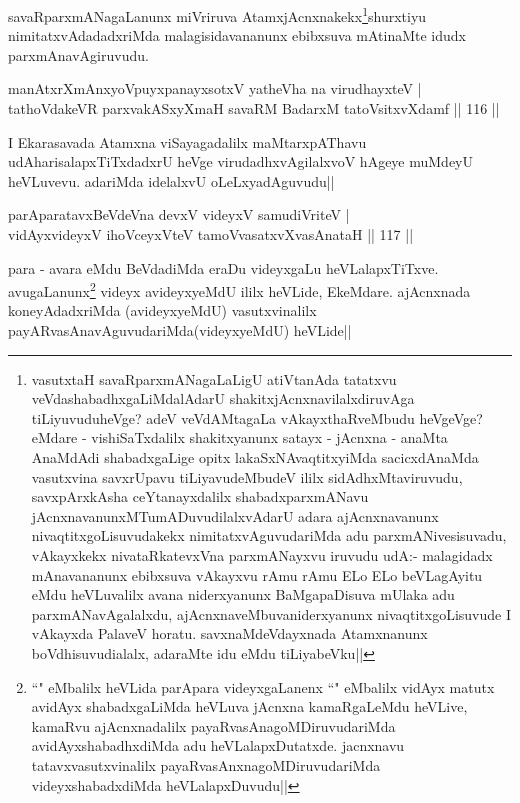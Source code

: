 \begin{artha}
savaRparxmANagaLanunx miVriruva AtamxjAcnxnakekx\footnote{vasutxtaH savaRparxmANagaLaLigU atiVtanAda tatatxvu veVdashabadhxgaLiMdalAdarU shakitxjAcnxnavilalxdiruvAga tiLiyuvuduheVge? adeV veVdAMtagaLa vAkayxthaRveMbudu heVgeVge? eMdare - vishiSaTxdalilx shakitxyanunx satayx - jAcnxna - anaMta AnaMdAdi shabadxgaLige opitx lakaSxNAvaqtitxyiMda sacicxdAnaMda vasutxvina savxrUpavu tiLiyavudeMbudeV ililx sidAdhxMtaviruvudu, savxpArxkAsha ceYtanayxdalilx shabadxparxmANavu jAcnxnavanunxMTumADuvudilalxvAdarU adara ajAcnxnavanunx nivaqtitxgoLisuvudakekx nimitatxvAguvudariMda adu parxmANivesisuvadu, vAkayxkekx nivataRkatevxVna parxmANayxvu iruvudu udA:- malagidadx mAnavananunx ebibxsuva vAkayxvu rAmu rAmu ELo ELo beVLagAyitu eMdu heVLuvalilx avana niderxyanunx BaMgapaDisuva mUlaka adu parxmANavAgalalxdu, ajAcnxnaveMbuvaniderxyanunx nivaqtitxgoLisuvude I vAkayxda PalaveV horatu. savxnaMdeVdayxnada Atamxnanunx boVdhisuvudialalx, adaraMte idu eMdu tiLiyabeVku||}shurxtiyu nimitatxvAdadadxriMda 
malagisidavananunx ebibxsuva mAtinaMte idudx parxmAnavAgiruvudu.
\end{artha}

\begin{shl}
manAtxrXmAnxyoV\s puyxpanayxsotxV yatheVha na virudhayxteV |\\
tathoVdakeVR parxvakASxyXmaH savaRM BadarxM tatoV\s sitxvXdamf \hfill || 116 ||
\end{shl}

\begin{artha}
I Ekarasavada Atamxna viSayagadalilx maMtarxpAThavu udAharisalapxTiTxdadxrU heVge virudadhxvAgilalxvoV hAgeye muMdeyU heVLuvevu. adariMda idelalxvU oLeLxyadAguvudu||
\end{artha}

\begin{shl}
parAparatavxBeVdeVna devxV videyxV samudiVriteV |\\
vidAyxvideyxV ihoVceyxVteV tamoVvasatxvXvasAnataH \hfill || 117 ||
\end{shl}

\begin{artha}
para - avara eMdu BeVdadiMda eraDu videyxgaLu heVLalapxTiTxve. avugaLanunx\footnote{``\stext" eMbalilx heVLida parApara videyxgaLanenx ``\stext" eMbalilx vidAyx matutx avidAyx shabadxgaLiMda heVLuva jAcnxna kamaRgaLeMdu heVLive, kamaRvu ajAcnxnadalilx payaRvasAnagoMDiruvudariMda avidAyxshabadhxdiMda adu heVLalapxDutatxde. jacnxnavu tatavxvasutxvinalilx payaRvasAnxnagoMDiruvudariMda videyxshabadxdiMda heVLalapxDuvudu||} videyx avideyxyeMdU ililx heVLide, EkeMdare. ajAcnxnada koneyAdadxriMda (avideyxyeMdU) vasutxvinalilx payARvasAnavAguvudariMda(videyxyeMdU) heVLide||
\end{artha}


